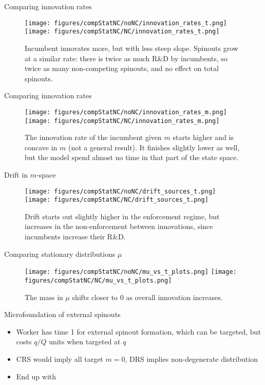 \documentclass[english,usenames,dvipsnames]{beamer}
\begin{document}
\begin{frame}{Comparing innovation rates}
\begin{figure}
	\texttt{[image: figures/compStatNC/noNC/innovation\_rates\_t.png]}
	\texttt{[image: figures/compStatNC/NC/innovation\_rates\_t.png]}
	\caption{\footnotesize Incumbent innovates more, but with less steep slope. Spinouts grow at a similar rate: there is twice as much R\&D by incumbents, so twice as many non-competing spinouts, and no effect on total spinouts.}
\end{figure}
\end{frame}

\begin{frame}{Comparing innovation rates}
\begin{figure}
	\texttt{[image: figures/compStatNC/noNC/innovation\_rates\_m.png]}
	\texttt{[image: figures/compStatNC/NC/innovation\_rates\_m.png]}
	\caption{\footnotesize The innovation rate of the incumbent given $m$ starts higher and is concave in $m$ (not a general result). It finishes slightly lower as well, but the model spend almost no time in that part of the state space.}
\end{figure}
\end{frame}

\begin{frame}{Drift in $m$-space}
\begin{figure}
	\texttt{[image: figures/compStatNC/noNC/drift\_sources\_t.png]}
	\texttt{[image: figures/compStatNC/NC/drift\_sources\_t.png]}
	\caption{\footnotesize Drift starts out slightly higher in the enforcement regime, but increases in the non-enforcement between innovations, since incumbents increase their R\&D.}
\end{figure}
\end{frame}

\begin{frame}{Comparing stationary distributions $\mu$}
\begin{figure}
	\texttt{[image: figures/compStatNC/noNC/mu\_vs\_t\_plots.png]}
	\texttt{[image: figures/compStatNC/NC/mu\_vs\_t\_plots.png]}
	\caption{\footnotesize The mass in $\mu$ shifts closer to 0 as overall innovation increases.}
\end{figure}
\end{frame}


\appendix

\begin{frame}{Microfoundation of external spinouts}
\begin{itemize}
	\item Worker has time 1 for external spinout formation, which can be targeted, but costs $q/Q$ units when targeted at $q$
	\item CRS would imply all target $m = 0$, DRS implies non-degenerate distribution
	\item End up with 
\end{itemize}
\end{frame}
\end{document}
